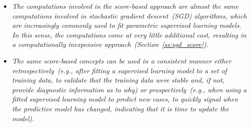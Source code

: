 \documentclass[twoside,11pt]{article}
\begin{document}
\begin{itemize}
\item
\textit{The computations involved in the score-based approach are almost the same computations involved in stochastic gradient descent~(SGD) algorithms, which are increasingly commonly used to fit parametric supervised learning models. In this sense, the computations come at very little additional cost, resulting in a computationally inexpensive approach~(Section~\ref{ss:sgd_score}).}
\item
\textit{The same score-based concepts can be used in a consistent manner either retrospectively~(e.g., after fitting a supervised learning model to a set of training data, to validate that the training data were stable and, if not, provide diagnostic information as to why) or prospectively~(e.g., when using a fitted supervised learning model to predict new cases, to quickly signal when the predictive model has changed, indicating that it is time to update the model).}
\end{itemize}



\end{document}
